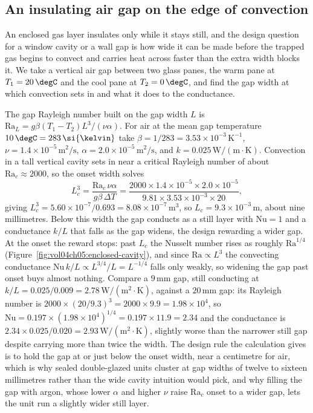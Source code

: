 \subsection{An insulating air gap on the edge of convection}

An enclosed gas layer insulates only while it stays still, and the design
question for a window cavity or a wall gap is how wide it can be made before
the trapped gas begins to convect and carries heat across faster than the
extra width blocks it. We take a vertical air gap between two glass panes,
the warm pane at $T_1 = 20\,\degC$ and the cool pane at $T_2 = 0\,\degC$, and
find the gap width at which convection sets in and what it does to the
conductance.

The gap Rayleigh number built on the gap width $L$ is $\text{Ra}_L =
g\beta(T_1 - T_2)L^3/(\nu\alpha)$. For air at the mean gap temperature
$10\,\degC = 283\,\si{\kelvin}$ take $\beta = 1/283 = 3.53\times10^{-3}\,
\si{\kelvin}^{-1}$, $\nu = 1.4\times10^{-5}\,\text{m}^2/\text{s}$, $\alpha =
2.0\times10^{-5}\,\text{m}^2/\text{s}$, and $k = 0.025\,\text{W}/(\text{m}
\cdot\si{\kelvin})$. Convection in a tall vertical cavity sets in near a
critical Rayleigh number of about $\text{Ra}_c \approx 2000$, so the onset
width solves
\[
L_c^3 = \frac{\text{Ra}_c\,\nu\alpha}{g\beta\,\Delta T} = \frac{2000\times
1.4\times10^{-5}\times2.0\times10^{-5}}{9.81\times3.53\times10^{-3}\times20},
\]
giving $L_c^3 = 5.60\times10^{-7}/0.693 = 8.08\times10^{-7}\,\text{m}^3$, so
$L_c = 9.3\times10^{-3}\,\text{m}$, about nine millimetres. Below this width
the gap conducts as a still layer with $\text{Nu} = 1$ and a conductance
$k/L$ that falls as the gap widens, the design rewarding a wider gap. At the
onset the reward stops: past $L_c$ the Nusselt number rises as roughly
$\text{Ra}^{1/4}$ (Figure~\ref{fig:vol04ch05:enclosed-cavity}), and since
$\text{Ra} \propto L^3$ the convecting conductance $\text{Nu}\,k/L \propto
L^{3/4}/L = L^{-1/4}$ falls only weakly, so widening the gap past onset buys
almost nothing. Compare a $9\,\si{\milli\meter}$ gap, still conducting at
$k/L = 0.025/0.009 = 2.78\,\text{W}/(\text{m}^2\cdot\si{\kelvin})$, against a
$20\,\si{\milli\meter}$ gap: its Rayleigh number is
$2000\times(20/9.3)^3 = 2000\times9.9 = 1.98\times10^4$, so
$\text{Nu} = 0.197\times(1.98\times10^4)^{1/4} = 0.197\times11.9 = 2.34$ and
the conductance is $2.34\times0.025/0.020 = 2.93\,\text{W}/(\text{m}^2\cdot
\si{\kelvin})$, slightly worse than the narrower still gap despite carrying
more than twice the width. The design rule the calculation gives is to hold
the gap at or just below the onset width, near a centimetre for air, which is
why sealed double-glazed units cluster at gap widths of twelve to sixteen
millimetres rather than the wide cavity intuition would pick, and why filling
the gap with argon, whose lower $\alpha$ and higher $\nu$ raise $\text{Ra}_c$
onset to a wider gap, lets the unit run a slightly wider still layer.


